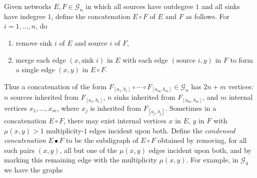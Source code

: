 \documentclass[12pt]{amsart}
\theoremstyle{definition}
\numberwithin{equation}{section}
\newcommand{\net}[1]{\mathcal G_{#1}}
\newcommand{\vertex}[1]{{#1}}
\begin{document}
Given networks $E, F \in \net{n}$
in which all sources have
outdegree $1$ and all sinks have indegree $1$, define
the concatenation $E \circ F$ of $E$ and $F$
as follows.  For $i = 1,\dotsc, n$, do
\begin{enumerate}
\item remove sink $i$ of $E$ and source $i$ of $F$,
\item merge each edge $(\vertex x, \text{sink }i)$ in $E$ with each edge
  $( \text{source }i, \vertex y )$ in $F$
  to form a single edge $(\vertex x, \vertex y)$ in $E \circ F$.
\end{enumerate}
Thus a concatenation of the form
$F_{[a_1,b_1]} \circ \cdots \circ F_{[a_m,b_m]} \in \net n$
has $2n + m$ vertices:
$n$ sources inherited from $F_{[a_1,b_1]}$, $n$ sinks inherited from $F_{[a_m,b_m]}$, and $m$ internal vertices %
$x_1,\dotsc, x_m$, where $x_j$ is inherited %
from $F_{[a_j,b_j]}$.
Sometimes in a concatenation $E \circ F$,
there may exist internal vertices $\vertex x$ in $E$, $\vertex y$ in $F$
with
$\mu(\vertex x, \vertex y) > 1$ multiplicity-$1$ edges
incident upon both.
Define the {\em condensed concatenation}
$E \bullet F$ to be the
subdigraph of $E \circ F$ obtained
by removing, for all such pairs $(\vertex x, \vertex y)$,
all but one of the $\mu(\vertex x, \vertex y)$ edges incident upon both,
and by marking this remaining edge with the multiplicity $\mu(\vertex x, \vertex y)$.
For example, in $\net 4$ we have the 
graphs
\end{document}
